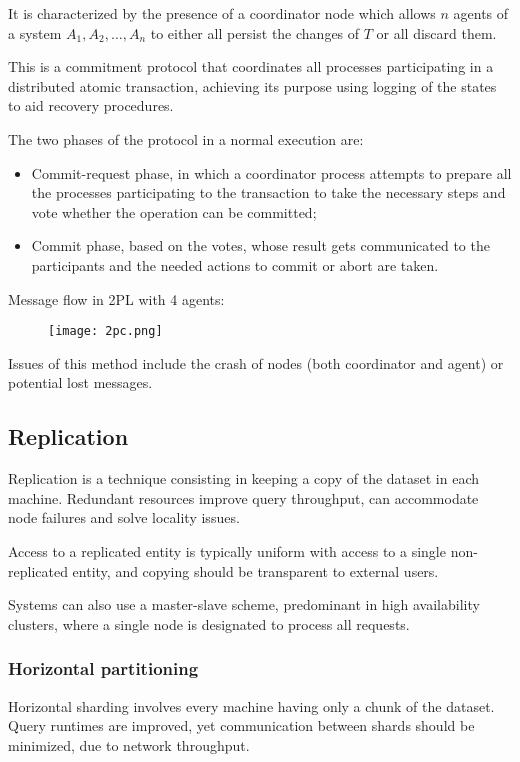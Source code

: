 It is characterized by the presence of a coordinator node which allows $n$ agents of a system $A_1, A_2, \dots, A_n$ to either all persist the changes of $T$ or all discard them.

This is a commitment protocol that coordinates all processes participating in a distributed atomic transaction, achieving its purpose using logging of the states to aid recovery procedures.

The two phases of the protocol in a normal execution are:
\begin{itemize}
	\item Commit-request phase, in which a coordinator process attempts to prepare all the processes participating to the transaction to take the necessary steps and vote whether the operation can be committed;
	\item Commit phase, based on the votes, whose result gets communicated to the participants and the needed actions to commit or abort are taken.
\end{itemize}

Message flow in 2PL with 4 agents:
\begin{figure}[h]
	\texttt{[image: 2pc.png]}
	\centering
\end{figure}

Issues of this method include the crash of nodes (both coordinator and agent) or potential lost messages.

\subsection{Replication}
Replication is a technique consisting in keeping a copy of the dataset in each machine. Redundant resources improve query throughput, can accommodate node failures and solve locality issues.

Access to a replicated entity is typically uniform with access to a single non-replicated entity, and copying should be transparent to external users. 

Systems can also use a master-slave scheme, predominant in high availability clusters, where a single node is designated to process all requests. 

\subsubsection{Horizontal partitioning}
Horizontal sharding involves every machine having only a chunk of the dataset. Query runtimes are improved, yet communication between shards should be minimized, due to network throughput.

